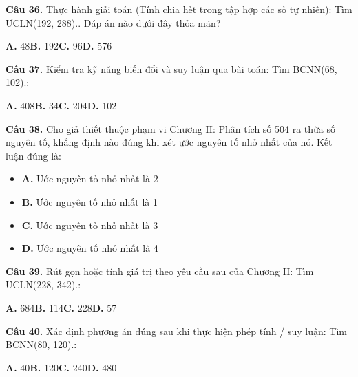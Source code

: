 \documentclass[11pt,a4paper]{article}
\begin{document}
\textbf{\color{primary} Câu 36.} Thực hành giải toán (Tính chia hết trong tập hợp các số tự nhiên): Tìm ƯCLN(192, 288).. Đáp án nào dưới đây thỏa mãn?\par
\hspace*{1.5em}\textbf{A.} 48\quad\quad \textbf{B.} 192\quad\quad \textbf{C.} 96\quad\quad \textbf{D.} 576\par\vspace{2pt}
\textbf{\color{primary} Câu 37.} Kiểm tra kỹ năng biến đổi và suy luận qua bài toán: Tìm BCNN(68, 102).:\par
\hspace*{1.5em}\textbf{A.} 408\quad\quad \textbf{B.} 34\quad\quad \textbf{C.} 204\quad\quad \textbf{D.} 102\par\vspace{2pt}
\textbf{\color{primary} Câu 38.} Cho giả thiết thuộc phạm vi Chương II: Phân tích số 504 ra thừa số nguyên tố, khẳng định nào đúng khi xét ước nguyên tố nhỏ nhất của nó. Kết luận đúng là:\par
\begin{itemize}\setlength{\itemsep}{1pt}\setlength{\parskip}{0pt}
  \item[] \textbf{A.} Ước nguyên tố nhỏ nhất là 2
  \item[] \textbf{B.} Ước nguyên tố nhỏ nhất là 1
  \item[] \textbf{C.} Ước nguyên tố nhỏ nhất là 3
  \item[] \textbf{D.} Ước nguyên tố nhỏ nhất là 4
\end{itemize}\vspace{2pt}
\textbf{\color{primary} Câu 39.} Rút gọn hoặc tính giá trị theo yêu cầu sau của Chương II: Tìm ƯCLN(228, 342).:\par
\hspace*{1.5em}\textbf{A.} 684\quad\quad \textbf{B.} 114\quad\quad \textbf{C.} 228\quad\quad \textbf{D.} 57\par\vspace{2pt}
\textbf{\color{primary} Câu 40.} Xác định phương án đúng sau khi thực hiện phép tính / suy luận: Tìm BCNN(80, 120).:\par
\hspace*{1.5em}\textbf{A.} 40\quad\quad \textbf{B.} 120\quad\quad \textbf{C.} 240\quad\quad \textbf{D.} 480\par\vspace{2pt}
\end{document}
